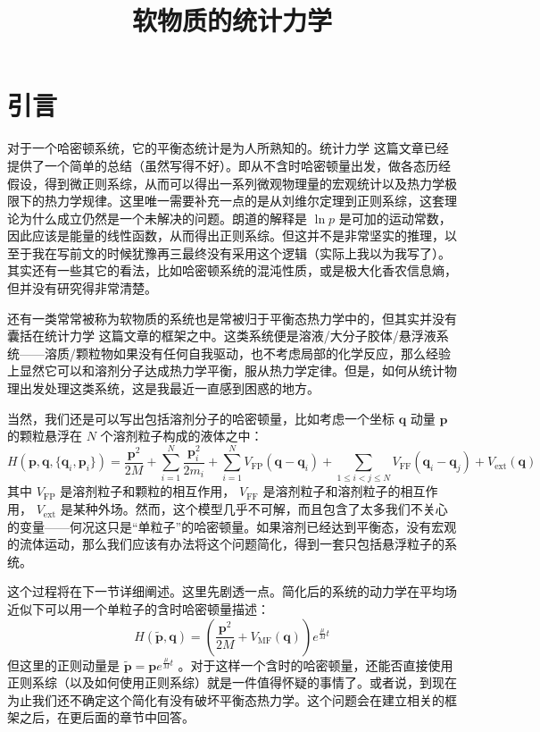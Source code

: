 \documentclass{ctexart}
\begin{document}
\title{软物质的统计力学}
\maketitle
\tableofcontents

\section{引言}
对于一个哈密顿系统，它的平衡态统计是为人所熟知的。统计力学 这篇文章已经提供了一个简单的总结（虽然写得不好）。即从不含时哈密顿量出发，做各态历经假设，得到微正则系综，从而可以得出一系列微观物理量的宏观统计以及热力学极限下的热力学规律。这里唯一需要补充一点的是从刘维尔定理到正则系综，这套理论为什么成立仍然是一个未解决的问题。朗道的解释是 $\ln p$ 是可加的运动常数，因此应该是能量的线性函数，从而得出正则系综。但这并不是非常坚实的推理，以至于我在写前文的时候犹豫再三最终没有采用这个逻辑（实际上我以为我写了）。其实还有一些其它的看法，比如哈密顿系统的混沌性质，或是极大化香农信息熵，但并没有研究得非常清楚。

还有一类常常被称为软物质的系统也是常被归于平衡态热力学中的，但其实并没有囊括在统计力学 这篇文章的框架之中。这类系统便是溶液/大分子胶体/悬浮液系统——溶质/颗粒物如果没有任何自我驱动，也不考虑局部的化学反应，那么经验上显然它可以和溶剂分子达成热力学平衡，服从热力学定律。但是，如何从统计物理出发处理这类系统，这是我最近一直感到困惑的地方。

当然，我们还是可以写出包括溶剂分子的哈密顿量，比如考虑一个坐标 $\bm{q}$ 动量 $\bm{p}$ 的颗粒悬浮在 $N$ 个溶剂粒子构成的液体之中：
\begin{equation}
H(\bm{p},\bm{q},\{\bm{q}_i,\bm{p}_i\})=\frac{\bm{p}^2}{2M}+\sum_{i=1}^N \frac{\bm{p}_i^2}{2m_i}+\sum_{i=1}^N V_{\mathrm{FP}}(\bm{q}-\bm{q}_i)+\sum_{1\leq i<j\leq N}V_{\mathrm{FF}}(\bm{q}_i-\bm{q}_j)+V_{\mathrm{ext}}(\bm{q})
\end{equation}
其中 $V_{\mathrm{FP}}$ 是溶剂粒子和颗粒的相互作用， $V_{\mathrm{FF}}$ 是溶剂粒子和溶剂粒子的相互作用， $V_{\mathrm{ext}}$ 是某种外场。然而，这个模型几乎不可解，而且包含了太多我们不关心的变量——何况这只是“单粒子”的哈密顿量。如果溶剂已经达到平衡态，没有宏观的流体运动，那么我们应该有办法将这个问题简化，得到一套只包括悬浮粒子的系统。

这个过程将在下一节详细阐述。这里先剧透一点。简化后的系统的动力学在平均场近似下可以用一个单粒子的含时哈密顿量描述：
\begin{equation}
H(\tilde{\bm{p}},\bm{q})=\left(\frac{\bm{p}^2}{2M}+V_{\mathrm{MF}}(\bm{q})\right)e^{\frac{\mu}{M}t}
\end{equation}
但这里的正则动量是 $\tilde{\bm{p}}=\bm{p}e^{\frac{\mu}{M}t}$ 。对于这样一个含时的哈密顿量，还能否直接使用正则系综（以及如何使用正则系综）就是一件值得怀疑的事情了。或者说，到现在为止我们还不确定这个简化有没有破坏平衡态热力学。这个问题会在建立相关的框架之后，在更后面的章节中回答。
\end{document}
